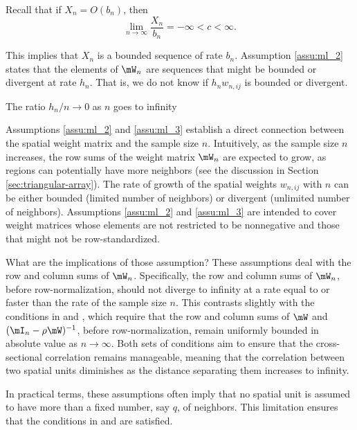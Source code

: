 \documentclass[english,12pt]{book}\usepackage[]{graphicx}\usepackage[]{xcolor}
\begin{document}
Recall that if $X_n = O(b_n)$, then
\begin{equation*}
\lim_{n\to \infty}\frac{X_n}{b_n} = -\infty < c < \infty.
\end{equation*}

This implies that $X_n$ is a bounded sequence of rate $b_n$. Assumption \ref{assu:ml_2} states that the elements of $\mW_{n}$ are sequences that might be bounded or divergent at rate $h_n$. That is, we do not know if $h_nw_{n,ij}$ is bounded or divergent.

\begin{assumption}\label{assu:ml_3}
	The ratio $h_n/n \to 0$ as $n$ goes to infinity
\end{assumption}

Assumptions \ref{assu:ml_2} and \ref{assu:ml_3} establish a direct connection between the spatial weight matrix and the sample size $n$. Intuitively, as the sample size $n$ increases, the row sums of the weight matrix $\mW_n$ are expected to grow, as regions can potentially have more neighbors (see the discussion in Section \ref{sec:triangular-array}). The rate of growth of the spatial weights $w_{n,ij}$ with $n$ can be either bounded (limited number of neighbors) or divergent (unlimited number of neighbors). Assumptions \ref{assu:ml_2} and \ref{assu:ml_3} are intended to cover weight matrices whose elements are not restricted to be nonnegative and those that might not be row-standardized. 

What are the implications of those assumption? These assumptions deal with the row and column sums of $\mW_n$. Specifically, the row and column sums of $\mW_n$,  before row-normalization, should not diverge to infinity at a rate equal to or faster than the rate of the sample size $n$. This contrasts slightly with the conditions in \cite{kelejian1998generalized} and \cite{kelejian1999generalized}, which require that the row and column sums of $\mW$ and $(\mI_n - \rho\mW)^{-1}$, before row-normalization, remain uniformly bounded in absolute value as $n \to \infty$. Both sets of conditions aim to ensure that the cross-sectional correlation remains manageable, meaning that the correlation between two spatial units diminishes as the distance separating them increases to infinity.  


In practical terms, these assumptions often imply that no spatial unit is assumed to have more than a fixed number, say $q$, of neighbors. This limitation ensures that the conditions in \cite{lee2004asymptotic} and \cite{kelejian1998generalized, kelejian1999generalized} are satisfied.  
\end{document}
